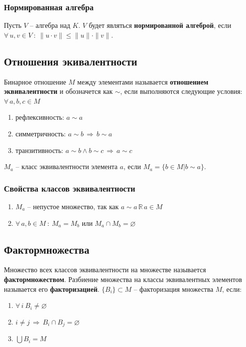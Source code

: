 \documentclass{article}
\newcommand{\R}{\mathbb R}
\begin{document}
\subsubsection{Нормированная алгебра}
Пусть $V$ -- алгебра над $K$. $V$ будет являться \textbf{нормированной алгеброй}, если $\forall\,u,v\in V\::\:\|u\cdot v\|\leqslant\|u\|\cdot\|v\|$.
\subsection{Отношения экивалентности}
Бинарное отношение $M$ между элементами называется \textbf{отношением эквивалентности} и обозначется как $\sim$, если выполняются следующие условия: $\forall\,a,b,c\in M$
\begin{enumerate}
    \item рефлексивность: $a\sim a$
    \item симметричность: $a\sim b\,\Rightarrow\,b\sim a$
    \item транзитивность: $a\sim b\wedge b\sim c\,\Rightarrow\,a\sim c$
\end{enumerate}
$M_a$ -- класс эквивалентности элемента $a$, если $M_a=\{b\in M|b\sim a\}$.
\newline
\newline
\subsubsection{Свойства классов эквивалентности}
\begin{enumerate}
    \item $M_a$ -- непустое множество, так как $a\sim a\,\R\,a\in M$
    \item $\forall\,a,b\in M\::\:M_a=M_b$ или $M_a\cap M_b=\varnothing$
\end{enumerate}
\subsection{Фактормножества}
Множество всех классов эквивалентности на множестве называется \textbf{фактормножеством}. Разбиение множества на классы эквивалентных элементов называется его \textbf{факторизацией}.
\newline
\newline
$\{B_i\}\subset M$ -- факторизация множества $M$, если:
\begin{enumerate}
    \item $\forall\,i\:B_i\neq\varnothing$
    \item $i\neq j\,\Rightarrow\,B_i\cap B_j=\varnothing$
    \item $\bigcup B_i=M$
\end{enumerate}
\end{document}
